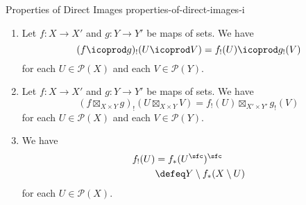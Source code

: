 \begin{proposition}{Properties of Direct Images \rmI}{properties-of-direct-images-i}
\begin{enumerate}
            \[
                (f_{!},f^{\otimes}_{!},f^{\otimes}_{!|\Unit})
                \colon
                (\mathcal{P}(X),\cap,X)
                \to
                (\mathcal{P}(Y),\cap,Y),
            \]%
            being equipped with inclusions%
            \[
                \begin{gathered}
                    f^{\otimes}_{!|U,V}   \colon f_{!}(U\cap V) \hookrightarrow f_{!}(U)\cap f_{!}(V),\\
                    f^{\otimes}_{!|\Unit} \colon f_{!}(X)       \hookrightarrow Y,
                \end{gathered}
            \]%
            natural in $U,V\in\mathcal{P}(X)$.
        \item\label{properties-of-direct-images-i-interaction-with-coproducts}Let $f\colon X\to X'$ and $g\colon Y\to Y'$ be maps of sets. We have
            \[
                (f\icoprod g)_{!}(U\icoprod V)%
                =%
                f_{!}(U)\icoprod g_{!}(V)%
            \]%
            for each $U\in\mathcal{P}(X)$ and each $V\in\mathcal{P}(Y)$.
        \item\label{properties-of-direct-images-i-interaction-with-products}Let $f\colon X\to X'$ and $g\colon Y\to Y'$ be maps of sets. We have
            \[
                (f\boxtimes_{X\times Y} g)_{!}(U\boxtimes_{X\times Y}V)%
                =%
                f_{!}(U)\boxtimes_{X'\times Y'}g_{!}(V)%
            \]%
            for each $U\in\mathcal{P}(X)$ and each $V\in\mathcal{P}(Y)$.
        \item\label{properties-of-direct-images-i-relation-to-codirect-images}We have
            \begin{align*}
                f_{!}(U) &=      f_{*}(U^{\sfc})^{\sfc}\\%
                         &\defeq Y\setminus f_{*}(X\setminus U)%
            \end{align*}
            for each $U\in\mathcal{P}(X)$.
    \end{enumerate}
\end{proposition}
